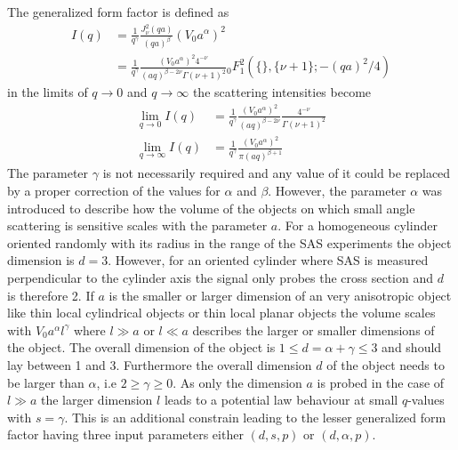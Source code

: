The generalized form factor is defined as
\begin{align}\label{eq:generalizedFF}
  I(q) &=  \frac{1}{q^\gamma}\frac{J_\nu^2(qa)}{(qa)^\beta} \left(V_0a^\alpha\right)^2 \\
       &=  \frac{1}{q^\gamma}\frac{\left(V_0a^{\alpha}\right)^2 4^{-\nu }}{(a q)^{\beta-2 \nu}\Gamma (\nu +1)^2} {}_0^{\phantom{2}}F^2_1\left(\{\},\{\nu+1\};-(qa)^2/4\right)
\end{align}
in the limits of $q\rightarrow 0$ and $q\rightarrow \infty$ the scattering intensities become
\begin{align}\label{eq:generalizedFFlimits}
\lim_{q\rightarrow 0}      I(q) & = \frac{1}{q^\gamma}\frac{\left(V_0a^{\alpha}\right)^2}{(a q)^{\beta -2\nu}}\frac{4^{-\nu }}{\Gamma (\nu +1)^2} \\
\lim_{q\rightarrow \infty} I(q) & = \frac{1}{q^\gamma}\frac{\left(V_0a^{\alpha}\right)^2}{\pi(aq)^{\beta+1}}
\end{align}
The parameter $\gamma$ is not necessarily required and any value of it could be replaced by a proper correction of the values for $\alpha$ and $\beta$. However, the parameter $\alpha$ was introduced to describe how the volume of the objects on which small angle scattering is sensitive scales with the parameter $a$. For a homogeneous cylinder oriented randomly with its radius in the range of the SAS experiments the object dimension is $d=3$. However, for an oriented cylinder where SAS is measured perpendicular to the cylinder axis the signal only probes the cross section and $d$ is therefore 2. If $a$ is the smaller or larger dimension of an very anisotropic object like thin local cylindrical objects or thin local planar objects the volume scales with $V_0a^\alpha l^\gamma$ where $l\gg a$ or $l\ll a$ describes the larger or smaller dimensions of the object. The overall dimension of the object is $1\leq d=\alpha+\gamma\leq3$ and should lay between 1 and 3. Furthermore the overall dimension $d$ of the object needs to be larger than $\alpha$, i.e $2\geq\gamma\geq 0$. As only the dimension $a$ is probed in the case of $l\gg a$ the larger dimension $l$ leads to a potential law behaviour at small $q$-values with $s=\gamma$. This is an additional constrain leading to the lesser generalized form factor having three input parameters either $(d,s,p)$ or $(d,\alpha,p)$.
